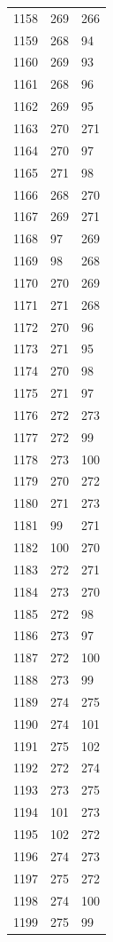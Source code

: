 \documentclass[a4paper,11pt]{article}
\begin{document}
\begin{center}
\begin{longtable}{|R{1.5cm}|R{1.5cm}|R{1.5cm}|}
 1158 &  269 &  266 \\
 1159 &  268 &   94 \\
 1160 &  269 &   93 \\
 1161 &  268 &   96 \\
 1162 &  269 &   95 \\
 1163 &  270 &  271 \\
 1164 &  270 &   97 \\
 1165 &  271 &   98 \\
 1166 &  268 &  270 \\
 1167 &  269 &  271 \\
 1168 &   97 &  269 \\
 1169 &   98 &  268 \\
 1170 &  270 &  269 \\
 1171 &  271 &  268 \\
 1172 &  270 &   96 \\
 1173 &  271 &   95 \\
 1174 &  270 &   98 \\
 1175 &  271 &   97 \\
 1176 &  272 &  273 \\
 1177 &  272 &   99 \\
 1178 &  273 &  100 \\
 1179 &  270 &  272 \\
 1180 &  271 &  273 \\
 1181 &   99 &  271 \\
 1182 &  100 &  270 \\
 1183 &  272 &  271 \\
 1184 &  273 &  270 \\
 1185 &  272 &   98 \\
 1186 &  273 &   97 \\
 1187 &  272 &  100 \\
 1188 &  273 &   99 \\
 1189 &  274 &  275 \\
 1190 &  274 &  101 \\
 1191 &  275 &  102 \\
 1192 &  272 &  274 \\
 1193 &  273 &  275 \\
 1194 &  101 &  273 \\
 1195 &  102 &  272 \\
 1196 &  274 &  273 \\
 1197 &  275 &  272 \\
 1198 &  274 &  100 \\
 1199 &  275 &   99 \\

\end{longtable}
\end{center}
\end{document}
